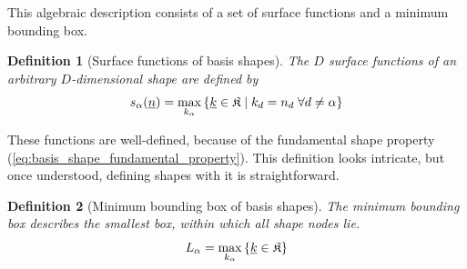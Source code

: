 \documentclass{article}
\newtheorem{definition}{Definition}
\begin{document}
This algebraic description consists of a set of surface functions and
a minimum bounding box. 

\begin{definition}[Surface functions of basis shapes]
  The \(D\) surface functions of an arbitrary \(D\)-dimensional shape are defined by
  \begin{equation}
  s_{\alpha}(\underline{n})=\max_{k_{\alpha}}
    \left\{\underline{k} \in \mathfrak{K} \;|\;
      k_d = n_d \; \forall d \neq \alpha
    \right\}
    \label{eq:basis_shape_surface_function}
  \end{equation}
\end{definition}

These functions are well-defined, because of the fundamental shape property
(\ref{eq:basis_shape_fundamental_property}).
This definition looks intricate, but once understood, defining shapes with it
is straightforward.

\begin{definition}[Minimum bounding box of basis shapes]
  The minimum bounding box describes the smallest
  box, within which all shape nodes lie.
  \begin{equation}
    L_{\alpha}=\max_{k_{\alpha}}\left\{\underline{k} \in \mathfrak{K}\right\}
    \label{eq:basis_shape_bbox}
  \end{equation}
\end{definition}
\end{document}
